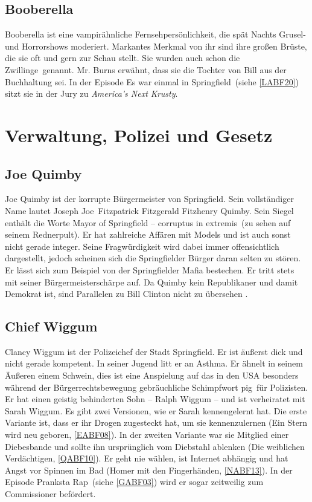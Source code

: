\subsection{Booberella}\label{Booberella}
Booberella ist eine vampirähnliche Fernsehpersönlichkeit, die spät Nachts Grusel- und Horrorshows moderiert. Markantes Merkmal von ihr sind ihre großen Brüste, die sie oft und gern zur Schau stellt. Sie wurden auch schon \glqq die Zwillinge\grqq\ genannt. Mr. Burns erwähnt, dass sie die Tochter von Bill aus der Buchhaltung sei. In der Episode \glqq Es war einmal in Springfield\grqq\ (siehe \ref{LABF20}) sitzt sie in der Jury zu \emph{America's Next Krusty}.


\section{Verwaltung, Polizei und Gesetz}

\subsection{Joe Quimby}
Joe Quimby ist der korrupte Bürgermeister von Springfield. Sein vollständiger Name lautet Joseph \glqq Joe\grqq\ Fitzpatrick Fitzgerald Fitzhenry Quimby. Sein Siegel ent\-hält die Worte \glqq Mayor of Springfield -- corruptus in extremis\grqq\ (zu sehen auf seinem Rednerpult). Er hat zahlreiche Affären mit Models und ist auch sonst nicht gerade integer. Seine Fragwürdigkeit wird dabei immer offensichtlich dargestellt, jedoch scheinen sich die Springfielder Bürger daran selten zu stören. Er lässt sich zum Beispiel von der Springfielder Mafia bestechen. Er tritt stets mit seiner Bürgermeisterschärpe auf. Da Quimby kein Republikaner und damit Demokrat ist, sind Parallelen zu Bill Clinton nicht zu übersehen \cite{Wikipedia}.

\subsection{Chief Wiggum}\label{ChiefWiggum}
Clancy Wiggum ist der Polizeichef der Stadt Springfield. Er ist äußerst dick und nicht gerade kompetent. In seiner Jugend litt er an Asthma. Er ähnelt in seinem Äußeren einem Schwein, dies ist eine Anspielung auf das in den USA besonders während der Bürgerrechtsbewegung gebräuchliche Schimpfwort \glqq pig\grqq\ für Polizisten. Er hat einen geistig behinderten Sohn -- Ralph Wiggum -- und ist verheiratet mit Sarah Wiggum. Es gibt zwei Versionen, wie er Sarah kennengelernt hat. Die erste Variante ist, dass er ihr Drogen zugesteckt hat, um sie kennenzulernen (\glqq Ein Stern wird neu geboren\grqq, \ref{EABF08}). In der zweiten Variante war sie Mitglied einer Diebesbande und sollte ihn ursprünglich vom Diebstahl ablenken (\glqq Die weiblichen Verdächtigen\grqq, \ref{QABF10}).
Er geht nie wählen, ist Internet abhängig und hat Angst vor Spinnen im Bad (\glqq Homer mit den Fingerhänden\grqq , \ref{NABF13}).
In der Episode \glqq Pranksta Rap\grqq\ (siehe \ref{GABF03}) wird er sogar zeitweilig zum Commissioner befördert.


